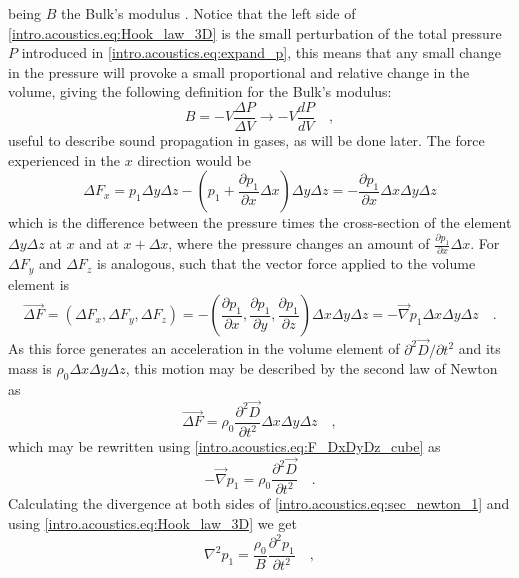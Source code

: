 being $B$ the Bulk's modulus \cite[p.~136]{Elmore}. Notice that the left side of \ref{intro.acoustics.eq:Hook_law_3D} is the small perturbation of the total pressure $P$ introduced in \ref{intro.acoustics.eq:expand_p}, this means that any small change in the pressure will provoke a small proportional and relative change in the volume, giving the following definition for the Bulk's modulus:
\begin{equation}\label{intro.acoustic.eq:Bulk_thermodynamic}
    B = -V\frac{\Delta P}{\Delta V} \rightarrow -V\frac{dP}{dV}\quad,
\end{equation}
useful to describe sound propagation in gases, as will be done later. The force experienced in the $x$ direction would be
\begin{equation}
    \Delta F_x = p_1\Delta y \Delta z - \left(p_1 + \frac{\partial p_1}{\partial x}\Delta x\right)\Delta y \Delta z = - \frac{\partial p_1}{\partial x}\Delta x \Delta y \Delta z
\end{equation}
which is the difference between the pressure times the cross-section of the element $\Delta y\Delta z$ at $x$ and at $x+\Delta x$, where the pressure changes an amount of $\frac{\partial p_1}{\partial x}\Delta x$. For $\Delta F_y$ and $\Delta F_z$ is analogous, such that the vector force applied to the volume element is
\begin{equation}\label{intro.acoustics.eq:F_DxDyDz_cube}
    \vec{\Delta F} = (\Delta F_x, \Delta F_y, \Delta F_z) = -\left(\frac{\partial p_1}{\partial x}, \frac{\partial p_1}{\partial y}, \frac{\partial p_1}{\partial z}\right)\Delta x\Delta y\Delta z = -\vec{\nabla} p_1 \Delta x\Delta y\Delta z\quad.
\end{equation}
As this force generates an acceleration in the volume element of $\partial^2\vec D/\partial t^2$ and its mass is $\rho_0\Delta x\Delta y\Delta z$, this motion may be described by the second law of Newton as
\begin{equation}
    \vec{\Delta F} = \rho_0\frac{\partial^2\vec D}{\partial t^2}\Delta x\Delta y\Delta z\quad,
\end{equation}
which may be rewritten using \ref{intro.acoustics.eq:F_DxDyDz_cube} as
\begin{equation}\label{intro.acoustics.eq:sec_newton_1}
    -\vec\nabla p_1 = \rho_0\frac{\partial^2\vec D}{\partial t^2}\quad.
\end{equation}
Calculating the divergence at both sides of 
\ref{intro.acoustics.eq:sec_newton_1} and using \ref{intro.acoustics.eq:Hook_law_3D} we get
\begin{equation}\label{intro.acoustics.eq:waves_p_Elmore}
    \nabla^2 p_1 = \frac{\rho_0}{B}\frac{\partial^2p_1}{\partial t^2} \quad,
\end{equation}
